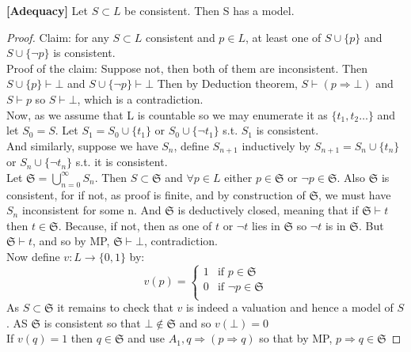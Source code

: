 \begin{theorem}{\bf[Adequacy]}\label{A;Adequacy} Let $S \subset L$ be
consistent. Then S has a model.
\end{theorem}
\begin{proof}
Claim: for any $S \subset L$ consistent and $p \in L$, at least one of
$S \cup \{p\}$ and $S \cup \{\neg p\}$ is consistent.\\
Proof of the claim: Suppose not, then both of them are inconsistent.
Then $S \cup \{p\} \vdash \bot$ and $S \cup \{\neg p\} \vdash \bot$
Then by Deduction theorem, $S \vdash (p \Rightarrow \bot)$ and $S \vdash p$
 so $S \vdash \bot$, which is a contradiction.\\
Now, as we assume that L is countable so we may enumerate it as
$\{t_1, t_2 \ldots \}$ and let $S_0=S$. Let $S_1=S_0 \cup \{t_1\}$ or
$S_0 \cup \{ \neg t_1\}$ s.t. $S_1$ is consistent.\\
And similarly, suppose we have $S_n$, define $S_{n+1}$ inductively by
$S_{n+1}=S_n \cup \{t_n \}$ or $S_n \cup \{\neg t_n\}$ s.t. it is consistent.\\
Let $\mathfrak{S}=\bigcup_{n=0}^\infty S_n$. Then $S \subset \mathfrak{S}$
and $\forall p \in L$ either $p \in \mathfrak{S}$ or $\neg p \in \mathfrak{S}$.
Also $\mathfrak{S}$ is consistent, for if not, as proof is finite,
and by construction of $\mathfrak{S}$, we must have $S_n$ inconsistent
for some n. And $\mathfrak{S}$ is deductively closed, meaning that if
$\mathfrak{S} \vdash t$ then $t \in \mathfrak{S}$. Because, if not,
then as one of $t$ or $\neg t$ lies in $\mathfrak{S}$ so $\neg t$ is
in $\mathfrak{S}$. But $\mathfrak{S} \vdash t$, and so by MP, $\mathfrak{S} \vdash \bot$, contradiction.\\
Now define $v : L \rightarrow \{0,1\}$ by:\\
\begin{equation*}
v(p)= \left\{
\begin{array}{ll}
1 & \text{if } p \in \mathfrak{S}\\
0 & \text{if } \neg p \in \mathfrak{S}\\
\end{array} \right.
\end{equation*}
As $S \subset \mathfrak{S}$ it remains to check that $v$ is indeed a
valuation and hence a model of $S$.
AS $\mathfrak{S}$ is consistent so that $\bot \not \in \mathfrak{S}$
and so $v(\bot)=0$\\
If $v(q)=1$ then $q \in \mathfrak{S}$ and use $A_1, q \Rightarrow
(p \Rightarrow q)$ so that by MP, $p \Rightarrow q \in \mathfrak{S}$

\end{proof}
